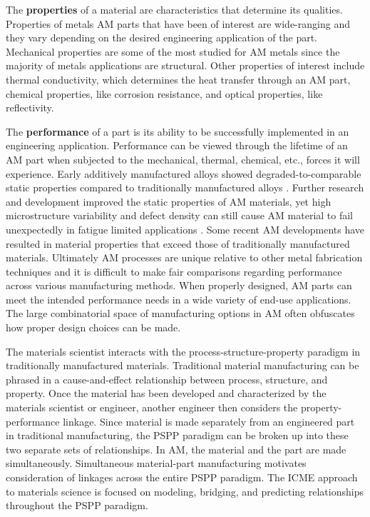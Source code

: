The \textbf{properties} of a material are characteristics that determine its qualities. Properties of metals AM parts that have been of interest are wide-ranging and they vary depending on the desired engineering application of the part. Mechanical properties are some of the most studied for AM metals since the majority of metals applications are structural. Other properties of interest include thermal conductivity, which determines the heat transfer through an AM part, chemical properties, like corrosion resistance, and optical properties, like reflectivity. 

The \textbf{performance} of a part is its ability to be successfully implemented in an engineering application. Performance can be viewed through the lifetime of an AM part when subjected to the mechanical, thermal, chemical, etc., forces it will experience. Early additively manufactured alloys showed degraded-to-comparable static properties compared to traditionally manufactured alloys \cite{Spierings2013}. Further research and development improved the static properties of AM materials, yet high microstructure variability and defect density can still cause AM material to fail unexpectedly in fatigue limited applications \cite{Wycisk2014, Edwards2014}. Some recent AM developments have resulted in material properties that exceed those of traditionally manufactured materials\cite{Probstle2016,Gallmeyer2019, Martin2017, Wang2017a, Liu2017a, Zhu2018}. Ultimately AM processes are unique relative to other metal fabrication techniques and it is difficult to make fair comparisons regarding performance across various manufacturing methods. When properly designed, AM parts can meet the intended performance needs in a wide variety of end-use applications. The large combinatorial space of manufacturing options in AM often obfuscates how proper design choices can be made.

The materials scientist interacts with the process-structure-property paradigm in traditionally manufactured materials. Traditional material manufacturing can be phrased in a cause-and-effect relationship between process, structure, and property. Once the material has been developed and characterized by the materials scientist or engineer, another engineer then considers the property-performance linkage. Since material is made separately from an engineered part in traditional manufacturing, the PSPP paradigm can be broken up into these two separate sets of relationships. In AM, the material and the part are made simultaneously. Simultaneous material-part manufacturing motivates consideration of linkages across the entire PSPP paradigm. The ICME approach to materials science is focused on modeling, bridging, and predicting relationships throughout the PSPP paradigm.

